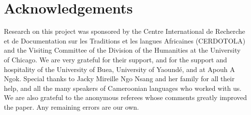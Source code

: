 \documentclass[output=paper,newtxmath,modfonts,nonflat,hidelinks]{langsci/langscibook}
\begin{document}
\section*{Acknowledgements}

Research on this project was sponsored by the Centre International de Recherche et de Documentation sur les Traditions et les langues Africaines (CERDOTOLA) and the Visiting Committee of the Division of the Humanities at the University of Chicago. We are very grateful for their support, and for the support and hospitality of the University of Buea, University of Yaound\'{e}, and at Apouh A Ngok. Special thanks to Jacky Mireille Ngo Nsang and her family for all their help, and all the many speakers of Cameroonian languages who worked with us. We are also grateful to the anonymous referees whose comments greatly improved the paper. Any remaining errors are our own.

\sloppy
\printbibliography[heading=subbibliography,notkeyword=this]
\end{document}
